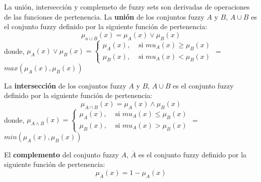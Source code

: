 \documentclass[letterpaper,spanish,11pt]{article}
\begin{document}
\vspace{0.5cm}
La uni\'{o}n, intersecci\'{o}n y complemeto de fuzzy sets son derivadas de operaciones de las funciones de pertenencia.
La \textbf{uni\'{o}n} de los conjuntos fuzzy $A$ y $B$, $A\cup B$ es el conjunto fuzzy definido por la siguiente funci\'{o}n de pertenencia:
$$\mu_{a\cup B}(x) = \mu_{A}(x) \vee \mu_{B}(x)$$
donde,
$\mu_{A}(x) \vee \mu_{B}(x) =\begin{cases} \mu_{A}(x), & \text{ si } mu_{A}(x) \geq \mu_{B}(x) \\ \mu_{B}(x), & \text{ si } mu_{A}(x) < \mu_{B}(x) \end{cases}$ = $max(\mu_{A}(x),\mu_{B}(x))$

La \textbf{intersecci\'{o}n} de los conjuntos fuzzy $A$ y $B$, $A\cup B$ es el conjunto fuzzy definido por la siguiente funci\'{o}n de pertenencia:
$$\mu_{A \cap B}(x) = \mu_{A}(x) \wedge \mu_{B}(x)$$
donde,
$\mu_{A \wedge B}(x) =\begin{cases} \mu_{A}(x), & \text{ si } mu_{A}(x) \leq \mu_{B}(x) \\ \mu_{B}(x), & \text{ si } mu_{A}(x) > \mu_{B}(x) \end{cases}$ = $min(\mu_{A}(x),\mu_{B}(x))$

El \textbf{complemento} del conjunto fuzzy $A$, $\overline{A}$ es el conjunto
fuzzy definido por la siguiente funci\'{o}n de pertenencia:
$$\mu_{\overline{A}}(x)=1-\mu_{A}(x)$$
\end{document}
